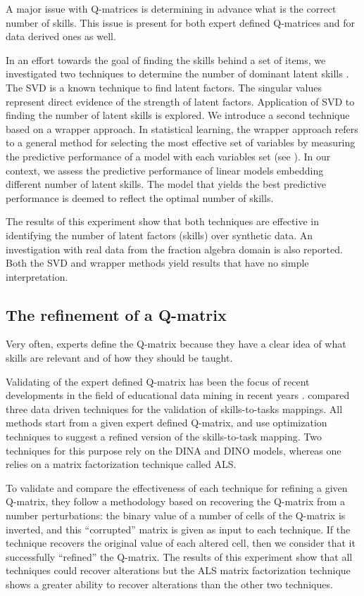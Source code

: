 A major issue with Q-matrices is determining in advance what is the correct number of skills.  This issue is present for both expert defined Q-matrices and for data derived ones as well.

In an effort towards the goal of finding the skills behind a set of items, we  investigated two techniques to determine the number of dominant latent skills \citep{Beheshti2012Numbers}. The SVD is a known technique to find latent factors. The singular values represent direct evidence of the strength of latent factors. Application of SVD to finding the number of latent skills is explored. We introduce a second technique based on a wrapper approach. In statistical learning, the wrapper approach refers to a general method for selecting the most effective set of variables by measuring the predictive performance of a model with each variables set (see \citet{Guyon2003}). In our context, we assess the predictive performance of linear models embedding different number of latent skills. The model that yields the best predictive performance is deemed to reflect the optimal number of skills.


The results of this experiment show that both techniques are effective in identifying the number of latent factors (skills) over synthetic data. An investigation with real data from the fraction algebra domain is also reported. Both the SVD and wrapper methods yield results that have no simple interpretation. 


\subsection{The refinement of a Q-matrix}
\label{edm2014}

Very often, experts define the Q-matrix because they have a clear idea of what skills are relevant and of how they should be taught.

Validating of the expert defined Q-matrix has been the focus of recent developments in the field of educational data mining in recent years \citep{delaTorre2008,chiu2013statistical,barnes2010novel,loye2011validite,Desmarais2013aied}. \citet{desmarais2014refinement} compared three data driven techniques for the validation of skills-to-tasks mappings.  All methods start from a given expert defined Q-matrix, and use optimization techniques to suggest a refined version of the skills-to-task mapping. Two techniques for this purpose rely on the DINA and DINO models, whereas one relies on a matrix factorization technique called ALS. 

To validate and compare the effectiveness of each technique for refining a given Q-matrix, they follow a methodology based on recovering the Q-matrix from a number perturbations: the binary value of a number of cells of the Q-matrix is inverted, and this ``corrupted'' matrix is given as input to each technique.  If the technique recovers the original value of each altered cell, then we consider that it successfully ``refined'' the Q-matrix. The results of this experiment show that all techniques could recover alterations but the ALS matrix factorization technique shows a greater ability to recover alterations than the other two techniques.



